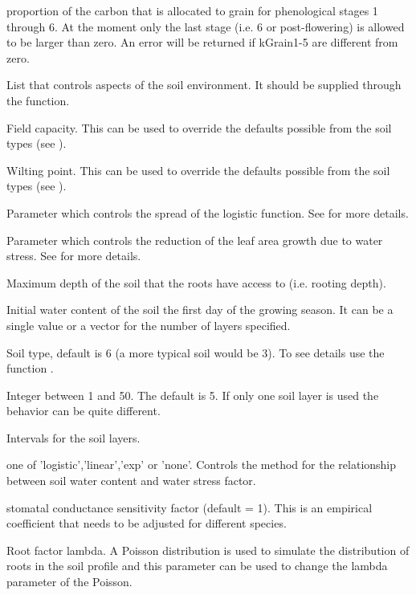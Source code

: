 \documentclass[letterpaper]{book}
\begin{document}
\begin{Arguments}
\begin{ldescription}
 proportion of the carbon that is
allocated to grain for phenological stages 1 through 6.
At the moment only the last stage (i.e. 6 or
post-flowering) is allowed to be larger than zero. An
error will be returned if kGrain1-5 are different from
zero.

\item[\code{soilControl}] List that controls aspects of the soil
environment. It should be supplied through the
 function.

 Field capacity. This can be used to
override the defaults possible from the soil types (see
).

 Wilting point.  This can be used to override
the defaults possible from the soil types (see
).

 Parameter which controls the spread of the
logistic function. See  for more
details.

 Parameter which controls the reduction of the
leaf area growth due to water stress. See
 for more details.

 Maximum depth of the soil that the roots
have access to (i.e. rooting depth).

 Initial water content of the soil the
first day of the growing season. It can be a single value
or a vector for the number of layers specified.

 Soil type, default is 6 (a more typical
soil would be 3). To see details use the function
.

 Integer between 1 and 50. The default is
5. If only one soil layer is used the behavior can be
quite different.

 Intervals for the soil layers.

 one of 'logistic','linear','exp' or 'none'.
Controls the method for the relationship between soil
water content and water stress factor.

 stomatal conductance sensitivity factor
(default = 1). This is an empirical coefficient that
needs to be adjusted for different species.

 Root factor lambda. A Poisson distribution is
used to simulate the distribution of roots in the soil
profile and this parameter can be used to change the
lambda parameter of the Poisson.


\end{ldescription}
\end{Arguments}
\end{document}
